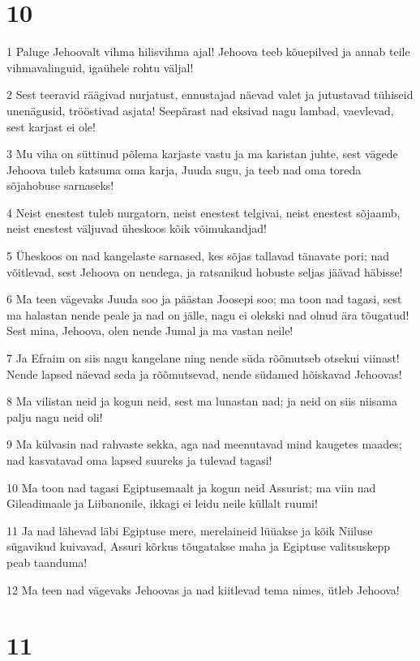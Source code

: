 \chapter{10}

\par 1 Paluge Jehoovalt vihma hilisvihma ajal! Jehoova teeb kõuepilved ja annab teile vihmavalinguid, igaühele rohtu väljal!
\par 2 Sest teeravid räägivad nurjatust, ennustajad näevad valet ja jutustavad tühiseid unenägusid, trööstivad asjata! Seepärast nad eksivad nagu lambad, vaevlevad, sest karjast ei ole!
\par 3 Mu viha on süttinud põlema karjaste vastu ja ma karistan juhte, sest vägede Jehoova tuleb katsuma oma karja, Juuda sugu, ja teeb nad oma toreda sõjahobuse sarnaseks!
\par 4 Neist enestest tuleb nurgatorn, neist enestest telgivai, neist enestest sõjaamb, neist enestest väljuvad üheskoos kõik võimukandjad!
\par 5 Üheskoos on nad kangelaste sarnased, kes sõjas tallavad tänavate pori; nad võitlevad, sest Jehoova on nendega, ja ratsanikud hobuste seljas jäävad häbisse!
\par 6 Ma teen vägevaks Juuda soo ja päästan Joosepi soo; ma toon nad tagasi, sest ma halastan nende peale ja nad on jälle, nagu ei olekski nad olnud ära tõugatud! Sest mina, Jehoova, olen nende Jumal ja ma vastan neile!
\par 7 Ja Efraim on siis nagu kangelane ning nende süda rõõmutseb otsekui viinast! Nende lapsed näevad seda ja rõõmutsevad, nende südamed hõiskavad Jehoovas!
\par 8 Ma vilistan neid ja kogun neid, sest ma lunastan nad; ja neid on siis niisama palju nagu neid oli!
\par 9 Ma külvasin nad rahvaste sekka, aga nad meenutavad mind kaugetes maades; nad kasvatavad oma lapsed suureks ja tulevad tagasi!
\par 10 Ma toon nad tagasi Egiptusemaalt ja kogun neid Assurist; ma viin nad Gileadimaale ja Liibanonile, ikkagi ei leidu neile küllalt ruumi!
\par 11 Ja nad lähevad läbi Egiptuse mere, merelaineid lüüakse ja kõik Niiluse sügavikud kuivavad, Assuri kõrkus tõugatakse maha ja Egiptuse valitsuskepp peab taanduma!
\par 12 Ma teen nad vägevaks Jehoovas ja nad kiitlevad tema nimes, ütleb Jehoova!


\chapter{11}

